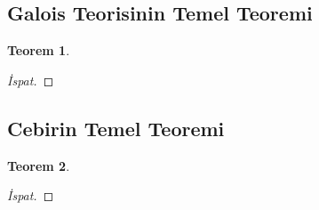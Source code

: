 \documentclass[draft]{article}
\newtheorem{thm}{Teorem}[section]
\theoremstyle{definition}
\theoremstyle{remark}
\begin{document}
    	\subsection{Galois Teorisinin Temel Teoremi}
    	
    	    \begin{thm}
    	        
    	    \end{thm}
    	    
    	    \begin{proof}[İspat]
    	        
    	    \end{proof}
    	    
    	\subsection{Cebirin Temel Teoremi}
    	
    	    \begin{thm}
    	        
    	    \end{thm}
    	    
    	    \begin{proof}[İspat]
    	        
    	    \end{proof}
	        
\newpage

    \begin{thebibliography}{10}
    
    	\bibitem{}
    	
    \end{thebibliography}
	
\end{document}
